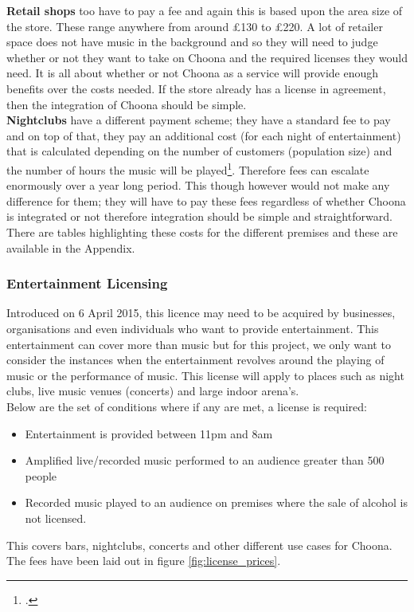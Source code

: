 \textbf{Retail shops} too have to pay a fee and again this is based upon the area size of the store.  These range anywhere from around £130 to £220.  A lot of retailer space does not have music in the background and so they will need to judge whether or not they want to take on Choona and the required licenses they would need. It is all about whether or not Choona as a service will provide enough benefits over the costs needed.  If the store already has a license in agreement, then the integration of Choona should be simple.  \\
\textbf{Nightclubs} have a different payment scheme; they have a standard fee to pay and on top of that, they pay an additional cost (for each night of entertainment) that is calculated depending on the number of customers (population size) and the number of hours the music will be played\footcite{ppl}.  Therefore fees can escalate enormously over a year long period.  This though however would not make any difference for them; they will have to pay these fees regardless of whether Choona is integrated or not therefore integration should be simple and straightforward.  
There are tables highlighting these costs for the different premises and these are available in the Appendix.  
      
\subsubsection{Entertainment Licensing}   
Introduced on 6 April 2015, this licence may need to be acquired by businesses, organisations and even individuals who want to provide entertainment.  This entertainment can cover more than music but for this project, we only want to consider the instances when the entertainment revolves around the playing of music or the performance of music.  This license will apply to places such as night clubs, live music venues (concerts) and large indoor arena's.\\
Below are the set of conditions where if any are met, a license is required:
\begin{itemize}
\item Entertainment is provided between 11pm and 8am
\item Amplified live/recorded music performed to an audience greater than 500 people
\item Recorded music played to an audience on premises where the sale of alcohol is not licensed.
\end{itemize}
This covers bars, nightclubs, concerts and other different use cases for Choona.  The fees have been laid out in figure \ref{fig:license_prices}.\\ 

